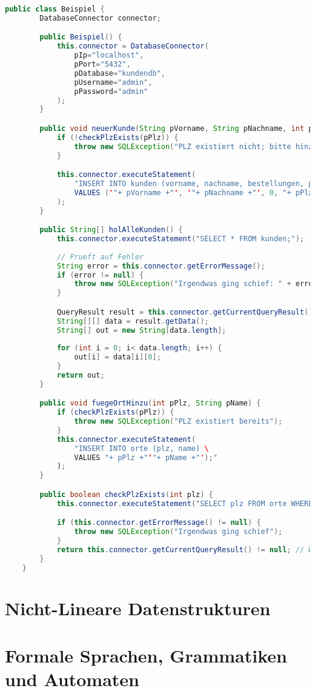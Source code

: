 \documentclass{article}
\begin{document}
	\begin{lstlisting}[language=Java]
	public class Beispiel {
		DatabaseConnector connector;

		public Beispiel() {
			this.connector = DatabaseConnector(
				pIp="localhost",
				pPort="5432",
				pDatabase="kundendb",
				pUsername="admin",
				pPassword="admin"
			);
		}

		public void neuerKunde(String pVorname, String pNachname, int pPlz) {
			if (!checkPlzExists(pPlz)) {
				throw new SQLException("PLZ existiert nicht; bitte hinzufuegen");
			}

			this.connector.executeStatement(
				"INSERT INTO kunden (vorname, nachname, bestellungen, plz) \
				VALUES ('"+ pVorname +"', '"+ pNachname +"', 0, "+ pPlz +");"
			);
		}

		public String[] holAlleKunden() {
			this.connector.executeStatement("SELECT * FROM kunden;");
		
			// Prueft auf Fehler
			String error = this.connector.getErrorMessage();
			if (error != null) {
				throw new SQLException("Irgendwas ging schief: " + error);
			}

			QueryResult result = this.connector.getCurrentQueryResult();
			String[][] data = result.getData();
			String[] out = new String[data.length];
		
			for (int i = 0; i< data.length; i++) {
				out[i] = data[i][0];
			}
			return out;
		}

		public void fuegeOrtHinzu(int pPlz, String pName) {
			if (checkPlzExists(pPlz)) {
				throw new SQLException("PLZ existiert bereits");
			}
			this.connector.executeStatement(
				"INSERT INTO orte (plz, name) \
				VALUES "+ pPlz +"'"+ pName +"');"
			);
		}

		public boolean checkPlzExists(int plz) {
			this.connector.executeStatement("SELECT plz FROM orte WHERE plz = " + String.valueOf(plz) + ";");

			if (this.connector.getErrorMessage() != null) {
				throw new SQLException("Irgendwas ging schief");
			}
			return this.connector.getCurrentQueryResult() != null; // Wenn ein Eintrag gefunden wurde, return wir true
		}
	}
	\end{lstlisting}


	\section{Nicht-Lineare Datenstrukturen}

	\section{Formale Sprachen, Grammatiken und Automaten}
	
\end{document}
